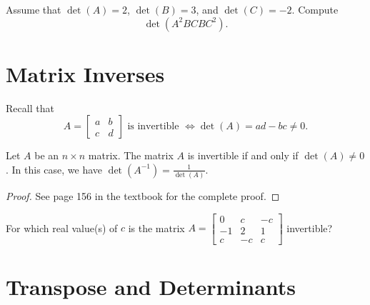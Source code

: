 \documentclass[20pt,a4paper]{extarticle}
\newcounter{example}
\newcounter{theorem}
\begin{document}
\begin{example}
Assume that $\det (A) = 2$, $\det (B) = 3$, and $\det (C) = -2$. Compute
	\[
		\det (A^2 BC B C^2).
	\]
\end{example}

\begin{solution}

\end{solution}

\newpage 

\section{Matrix Inverses}

Recall that
	\[
		A = \begin{bmatrix} a & b \\ c & d \end{bmatrix} \text{ is invertible } \iff \det (A) = ad - bc \neq 0 .
	\]

\begin{theorem}
Let $A$ be an $n \times n$ matrix. The matrix $A$ is invertible if and only if $\det (A) \neq 0$. In this case, we have $\det (A^{-1}) = \frac{1}{\det (A)}$.
\end{theorem}

\begin{proof}
See page 156 in the textbook for the complete proof.
\end{proof}

\vspace*{20pt}

\begin{example}
For which real value(s) of $c$ is the matrix $A = \begin{bmatrix} 0 & c & -c \\ -1 & 2 & 1 \\ c & -c & c \end{bmatrix}$ invertible?
\end{example}

\begin{solution}

\end{solution}

\newpage 

\phantom{2}

\newpage 

\section{Transpose and Determinants}
\end{document}
